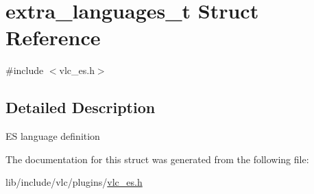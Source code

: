 \hypertarget{structextra__languages__t}{}\section{extra\+\_\+languages\+\_\+t Struct Reference}
\label{structextra__languages__t}


{\ttfamily \#include $<$vlc\+\_\+es.\+h$>$}



\subsection{Detailed Description}
ES language definition 

The documentation for this struct was generated from the following file\+:\begin{DoxyCompactItemize}
\item 
lib/include/vlc/plugins/\hyperlink{vlc__es_8h}{vlc\+\_\+es.\+h}\end{DoxyCompactItemize}
